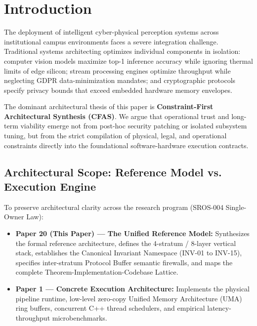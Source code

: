 \documentclass[conference]{IEEEtran}
\begin{document}
\section{Introduction}
The deployment of intelligent cyber-physical perception systems across institutional campus environments faces a severe integration challenge. Traditional systems architecting optimizes individual components in isolation: computer vision models maximize top-1 inference accuracy while ignoring thermal limits of edge silicon; stream processing engines optimize throughput while neglecting GDPR data-minimization mandates; and cryptographic protocols specify privacy bounds that exceed embedded hardware memory envelopes.

The dominant architectural thesis of this paper is \textbf{Constraint-First Architectural Synthesis (CFAS)}. We argue that operational trust and long-term viability emerge not from post-hoc security patching or isolated subsystem tuning, but from the strict compilation of physical, legal, and operational constraints directly into the foundational software-hardware execution contracts.

\subsection{Architectural Scope: Reference Model vs. Execution Engine}
To preserve architectural clarity across the research program (SROS-004 Single-Owner Law):
\begin{itemize}
    \item \textbf{Paper 20 (This Paper) --- The Unified Reference Model:} Synthesizes the formal reference architecture, defines the 4-stratum / 8-layer vertical stack, establishes the Canonical Invariant Namespace (INV-01 to INV-15), specifies inter-stratum Protocol Buffer semantic firewalls, and maps the complete Theorem-Implementation-Codebase Lattice.
    \item \textbf{Paper 1 --- Concrete Execution Architecture:} Implements the physical pipeline runtime, low-level zero-copy Unified Memory Architecture (UMA) ring buffers, concurrent C++ thread schedulers, and empirical latency-throughput microbenchmarks.
\end{itemize}

\end{document}
